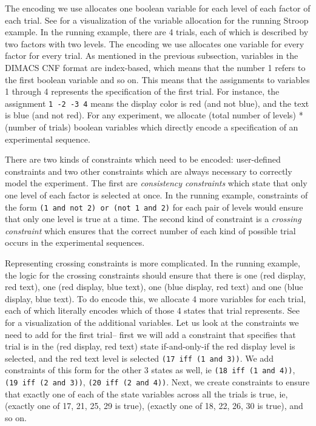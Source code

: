 The encoding we use allocates one boolean variable for each level of each factor of each trial. See  for a visualization of the variable allocation for the running Stroop example. In the running example, there are 4 trials, each of which is described by two factors with two levels. The encoding we use allocates one variable for every factor for every trial. As mentioned in the previous subsection, variables in the DIMACS CNF format are index-based, which means that the number 1 refers to the first boolean variable and so on. This means that the assignments to variables 1 through 4 represents the specification of the first trial. For instance, the assignment \texttt{1 -2 -3 4} means the display color is red (and not blue), and the text is blue (and not red). For any experiment, we allocate (total number of levels) * (number of trials) boolean variables which directly encode a specification of an experimental sequence.






There are two kinds of constraints which need to be encoded: user-defined constraints and two other constraints which are always necessary to correctly model the experiment. The first are \emph{consistency constraints} which state that only one level of each factor is selected at once. In the running example, constraints of the form \texttt{(1 and not 2) or (not 1 and 2)} for each pair of levels would ensure that only one level is true at a time. The second kind of constraint is a \emph{crossing constraint} which ensures that the correct number of each kind of possible trial occurs in the experimental sequences.

Representing crossing constraints is more complicated. In the running example, the logic for the crossing constraints should ensure that there is one (red display, red text), one (red display, blue text), one (blue display, red text) and one (blue display, blue text). To do encode this, we allocate 4 more variables for each trial, each of which literally encodes which of those 4 states that trial represents. See  for a visualization of the additional variables. Let us look at the constraints we need to add for the first trial-- first we will add a constraint that specifies that trial is in the (red display, red text) state if-and-only-if the red display level is selected, and the red text level is selected \texttt{(17 iff (1 and 3))}. We add constraints of this form for the other 3 states as well, ie \texttt{(18 iff (1 and 4))}, \texttt{(19 iff (2 and 3))}, \texttt{(20 iff (2 and 4))}. Next, we create constraints to ensure that exactly one of each of the state variables across all the trials is true, ie, (exactly one of 17, 21, 25, 29 is true), (exactly one of 18, 22, 26, 30 is true), and so on.

